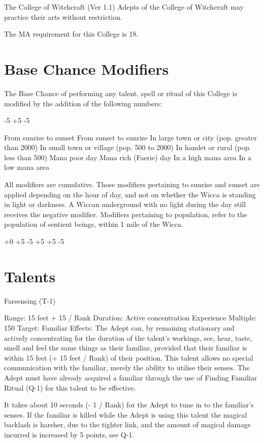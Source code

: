 \begin{Chapter}{The College of Witchcraft (Ver 1.1)}
Adepts  of  the  College  of  Witchcraft  may  practice 
their arts without restriction. 

The MA requirement for this College is 18. 


\section{Base Chance Modifiers}

The Base Chance of performing any talent, spell or 
ritual of this College is modified by the addition of 
the following numbers: 

-5 
+5 
-5 

From sunrise to sunset 
From sunset to sunrise 
In large town or city (pop. greater than 
2000) 
In small town or village (pop. 500 to 2000)  
In hamlet or rural (pop. less than 500)  
Mana poor day 
Mana rich (Faerie) day 
In a high mana area 
In a low mana area 

All modifiers are cumulative.  Those modifiers pertaining to sunrise
and sunset are applied depending on the hour of day, and not on
whether the Wicca is standing in light or darkness.  A Wiccan
underground with no light during the day still receives the negative
modifier.  Modifiers pertaining to population, refer to the population
of sentient beings, within 1 mile of the Wicca.

+0 
+5 
-5 
 +5 
+5 
-5 


\section{Talents}

Farsensing (T-1) 

Range: 15 feet + 15 / Rank 
Duration: Active concentration 
Experience Multiple: 150 
Target: Familiar 
Effects:  The  Adept  can,  by  remaining  stationary 
and  actively  concentrating  for  the  duration  of  the 
talent’s  workings,  see,  hear,  taste,  smell  and  feel 
the  same  things  as  their  familiar,  provided  that 
their familiar is within 15 feet (+ 15 feet / Rank) of 
their  position.  This  talent  allows  no  special  communication  with the  familiar,  merely  the  ability  to 
utilise  their  senses.  The  Adept  must  have  already 
acquired  a  familiar  through  the  use  of  Finding 
Familiar Ritual (Q-1) for this talent to be effective. 

It takes about 10 seconds (- 1 / Rank) for the Adept to tune in to the
familiar’s senses. If the familiar is killed while the Adept is using
this talent the magical backlash is harsher, due to the tighter link,
and the amount of magical damage incurred is increased by 5 points,
see Q-1.


\end{Chapter}

